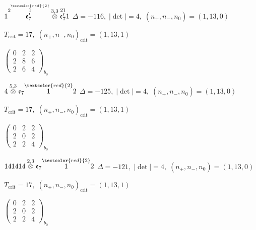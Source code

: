 \documentclass[10pt]{article}
\begin{document}
\smallskip

$1\overset{2\overset{\textcolor{red}{2}}{1}}{\mathfrak{e}_7'}\overset{3,3}{\otimes}\overset{21}{\mathfrak{e}_7'}1$ \quad $\Delta=-116,\; |\det|=4,\; (n_+,n_-,n_0)=(1,13,0)$

\hspace{1em}$T_{\text{crit}}=17,\; (n_+,n_-,n_0)_{\text{crit}}=(1,13,1)$

\hspace{2em}$\left(\begin{smallmatrix}0 & 2 & 2 \\ 2 & 8 & 6 \\ 2 & 6 & 4\end{smallmatrix}\right)_{\!b_0}$

\smallskip

$4\overset{5,3}{\otimes}\mathfrak{e}_7\overset{\textcolor{red}{2}}{1}2$ \quad $\Delta=-125,\; |\det|=4,\; (n_+,n_-,n_0)=(1,13,0)$

\hspace{1em}$T_{\text{crit}}=17,\; (n_+,n_-,n_0)_{\text{crit}}=(1,13,1)$

\hspace{2em}$\left(\begin{smallmatrix}0 & 2 & 2 \\ 2 & 0 & 2 \\ 2 & 2 & 4\end{smallmatrix}\right)_{\!b_0}$

\smallskip

$141414\overset{2,3}{\otimes}\mathfrak{e}_7\overset{\textcolor{red}{2}}{1}2$ \quad $\Delta=-121,\; |\det|=4,\; (n_+,n_-,n_0)=(1,13,0)$

\hspace{1em}$T_{\text{crit}}=17,\; (n_+,n_-,n_0)_{\text{crit}}=(1,13,1)$

\hspace{2em}$\left(\begin{smallmatrix}0 & 2 & 2 \\ 2 & 0 & 2 \\ 2 & 2 & 4\end{smallmatrix}\right)_{\!b_0}$

\smallskip
\end{document}
